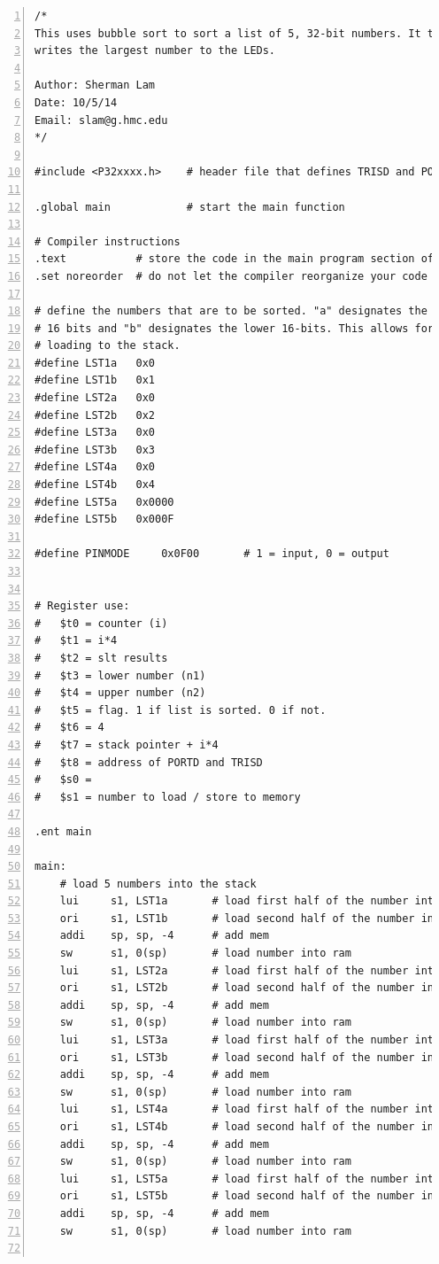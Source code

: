 \documentclass[11pt]{article}
\begin{document}
\begin{lstlisting}[numbers=left,basicstyle=\footnotesize]
/*
This uses bubble sort to sort a list of 5, 32-bit numbers. It then
writes the largest number to the LEDs.

Author: Sherman Lam
Date: 10/5/14
Email: slam@g.hmc.edu
*/

#include <P32xxxx.h>    # header file that defines TRISD and PORTD

.global main            # start the main function

# Compiler instructions
.text           # store the code in the main program section of RAM
.set noreorder  # do not let the compiler reorganize your code

# define the numbers that are to be sorted. "a" designates the upper
# 16 bits and "b" designates the lower 16-bits. This allows for easy
# loading to the stack.
#define LST1a   0x0
#define LST1b   0x1
#define LST2a   0x0
#define LST2b   0x2
#define LST3a   0x0
#define LST3b   0x3
#define LST4a   0x0
#define LST4b   0x4
#define LST5a   0x0000
#define LST5b   0x000F

#define PINMODE     0x0F00       # 1 = input, 0 = output


# Register use:
#   $t0 = counter (i)
#   $t1 = i*4
#   $t2 = slt results
#   $t3 = lower number (n1)
#   $t4 = upper number (n2)
#   $t5 = flag. 1 if list is sorted. 0 if not.
#   $t6 = 4
#   $t7 = stack pointer + i*4
#   $t8 = address of PORTD and TRISD
#   $s0 = 
#   $s1 = number to load / store to memory

.ent main

main:
    # load 5 numbers into the stack
    lui     s1, LST1a       # load first half of the number into reg
    ori     s1, LST1b       # load second half of the number into reg
    addi    sp, sp, -4      # add mem
    sw      s1, 0(sp)       # load number into ram
    lui     s1, LST2a       # load first half of the number into reg
    ori     s1, LST2b       # load second half of the number into reg
    addi    sp, sp, -4      # add mem
    sw      s1, 0(sp)       # load number into ram
    lui     s1, LST3a       # load first half of the number into reg
    ori     s1, LST3b       # load second half of the number into reg
    addi    sp, sp, -4      # add mem
    sw      s1, 0(sp)       # load number into ram
    lui     s1, LST4a       # load first half of the number into reg
    ori     s1, LST4b       # load second half of the number into reg
    addi    sp, sp, -4      # add mem
    sw      s1, 0(sp)       # load number into ram
    lui     s1, LST5a       # load first half of the number into reg
    ori     s1, LST5b       # load second half of the number into reg
    addi    sp, sp, -4      # add mem
    sw      s1, 0(sp)       # load number into ram


\end{lstlisting}
\end{document}
